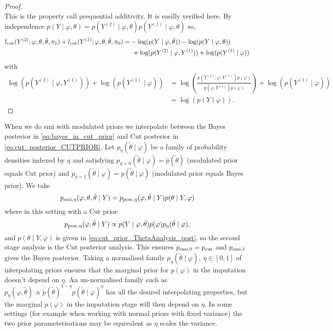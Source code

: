 \begin{proof}
\[  \]
  This is the property \cite{Nicholls2022smi} call prequential additivity. It is easilly verified here.
  By independence $p(Y \mid \varphi,\theta)=p(Y^{(2)} \mid \varphi,\theta)p(Y^{(1)} \mid \varphi,\theta)$ so,
  \begin{align*}
    l_{\operatorname{\text{cut}}}(Y^{(2)}; \varphi,\theta,\tilde\theta, \pi_1)+l_{\operatorname{\text{cut}}}(Y^{(1)}; \varphi,\theta,\tilde\theta, \pi_0) = &
    -\log(p(Y \mid \varphi,\tilde\theta))-\log(p(Y \mid \varphi,\theta))                                                                                                                   \\
                                                                                                                  & \ +\log(p(Y^{(2)} \mid \varphi,Y^{(1)}))+\log(p(Y^{(1)} \mid \varphi))
  \end{align*}
  with
  \begin{align*}
    \log(p(Y^{(2)} \mid \varphi,Y^{(1)}))+\log(p(Y^{(1)} \mid \varphi)) & = \log\left(\frac{p(Y^{(2)},\varphi,Y^{(1)})p(\varphi)}{p(\varphi,Y^{(1)})p(\varphi)}\right)+\log(p(Y^{(1)} \mid \varphi)) \\
                                                                        & =\log(p(Y \mid \varphi)).
  \end{align*}
\end{proof}

When we do \acrshort*{smi} with modulated priors we interpolate between the Bayes posterior in \cref{eq:bayes_in_cut_prior} and Cut posterior in \cref{eq:cut_posterior_CUTPRIOR}. Let $p_\eta(\tilde\theta \mid \varphi)$ be a family of probability densities indexed by $\eta$ and satisfying
$p_{\eta=0}(\tilde\theta \mid \varphi)=\tilde p(\tilde\theta)$ (modulated prior equals Cut prior) and $p_{\eta=1}(\tilde\theta \mid \varphi)=p(\tilde\theta \mid \varphi)$ (modulated prior equals Bayes prior).
%
We take
\begin{equation}\label{eq:smi_full_cutprior}
  p_{\operatorname{\text{smi}},\eta}(\varphi,\theta,\tilde\theta \mid Y)=p_{\operatorname{\text{pow}}, \eta}(\varphi,\tilde\theta \mid Y)p(\theta \mid Y,\varphi)
\end{equation}
where in this setting with a Cut prior
\[
  p_{\operatorname{\text{pow}}, \eta}(\varphi,\tilde\theta \mid Y) \propto p(Y \mid \varphi,\tilde\theta)p(\varphi) p_\eta(\tilde\theta \mid \varphi),
\]
and $p(\theta \mid Y,\varphi)$ is given in \cref{eq:cut_prior_ThetaAnalysis_post}, so the second stage analysis is the Cut posterior analysis.
This ensures $p_{\operatorname{\text{smi}},0}=p_{\operatorname{\text{cut}}}$ and $p_{\operatorname{\text{smi}},1}$ gives the Bayes posterior. Taking a normalised family $p_\eta(\tilde\theta \mid \varphi),\ \eta\in [0,1]$ of interpolating priors ensures that the marginal prior for $p(\varphi)$ in the imputation doesn't depend on $\eta$. An un-normalised family such as $p_\eta(\varphi,\tilde\theta)\propto \tilde p(\tilde\theta)^{1-\eta} p(\tilde\theta \mid \varphi)^\eta$ has all the desired interpolating properties, but the marginal $p(\varphi)$ in the imputation stage will then depend on $\eta$.
In some settings (for example when working with normal priors with fixed variance) the two prior parameterisations may be equivalent as $\eta$ scales the variance.

